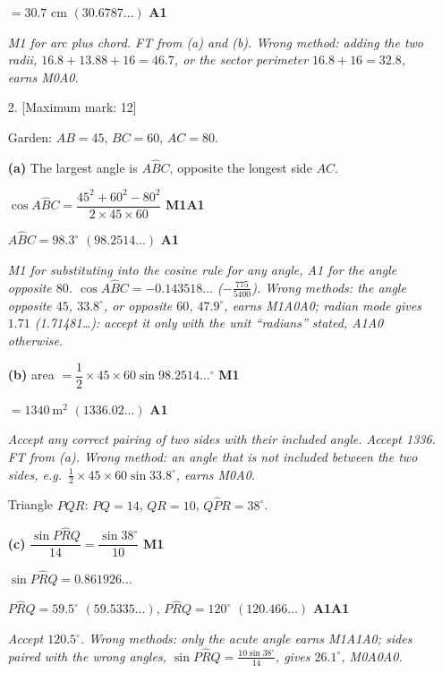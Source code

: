 \documentclass[12pt, twoside]{article}
\begin{document}
\begin{enumerate}[itemsep=0.2cm]
$= 30.7$ cm \quad $(30.6787\ldots)$ \hfill \textbf{A1}

\emph{M1 for arc plus chord. FT from (a) and (b). Wrong method: adding the
two radii, $16.8 + 13.88 + 16 = 46.7$, or the sector perimeter
$16.8 + 16 = 32.8$, earns M0A0.}

\newpage

\item[2.] [Maximum mark: 12]

Garden: $AB = 45$, $BC = 60$, $AC = 80$.

\textbf{(a)} The largest angle is $A\hat{B}C$, opposite the longest side
$AC$.

$\cos A\hat{B}C = \dfrac{45^{2} + 60^{2} - 80^{2}}{2 \times 45 \times 60}$
\hfill \textbf{M1A1}

$A\hat{B}C = 98.3^\circ$ \quad $(98.2514\ldots)$ \hfill \textbf{A1}

\emph{M1 for substituting into the cosine rule for any angle, A1 for the
angle opposite $80$. $\cos A\hat{B}C = -0.143518\ldots$ ($-\frac{775}{5400}$).
Wrong methods: the angle opposite $45$, $33.8^\circ$, or opposite $60$,
$47.9^\circ$, earns M1A0A0; radian mode gives $1.71$ (1.71481\ldots):
accept it only with the unit ``radians'' stated, A1A0 otherwise.}

\textbf{(b)} area $= \dfrac{1}{2} \times 45 \times 60 \sin 98.2514\ldots^\circ$
\hfill \textbf{M1}

$= 1340\ \text{m}^{2}$ \quad $(1336.02\ldots)$ \hfill \textbf{A1}

\emph{Accept any correct pairing of two sides with their included angle.
Accept 1336. FT from (a). Wrong method: an angle that is not included
between the two sides, e.g.\ $\frac{1}{2} \times 45 \times 60 \sin
33.8^\circ$, earns M0A0.}

Triangle $PQR$: $PQ = 14$, $QR = 10$, $Q\hat{P}R = 38^\circ$.

\textbf{(c)} $\dfrac{\sin P\hat{R}Q}{14} = \dfrac{\sin 38^\circ}{10}$
\hfill \textbf{M1}

$\sin P\hat{R}Q = 0.861926\ldots$

$P\hat{R}Q = 59.5^\circ$ \quad $(59.5335\ldots)$, \quad
$P\hat{R}Q = 120^\circ$ \quad $(120.466\ldots)$ \hfill \textbf{A1A1}

\emph{Accept $120.5^\circ$. Wrong methods: only the acute angle earns
M1A1A0; sides paired with the wrong angles, $\sin P\hat{R}Q =
\frac{10\sin 38^\circ}{14}$, gives $26.1^\circ$, M0A0A0.}


\end{enumerate}
\end{document}
